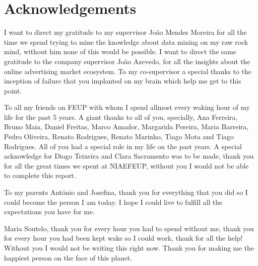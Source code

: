 \chapter*{Acknowledgements}

I want to direct my gratitude to my supervisor João Mendes Moreira for all the
time we spend trying to mine the knowledge about data mining on my raw rock
mind, without him none of this would be possible. I want to direct the same
gratitude to the company supervisor João Azevedo, for all the insights about the
online advertising market ecosystem. To my co-supervisor a special thanks to the
inception of failure that you implanted on my brain which help me get to this
point.

To all my friends on FEUP with whom I spend allmost every waking hour of my life
for the past 5 years. A giant thanks to all of you, specially, Ana Ferreira,
Bruno Maia, Daniel Freitas, Marco Amador, Margarida Pereira, Maria Barreira,
 Pedro Oliveira, Renato Rodrigues, Renato Marinho, Tiago Mota and Tiago Rodrigues. All of you had
a special role in my life on the past years. A special acknowledge for
Diogo Teixeira and Clara Sacramento was to be made, thank you for all the great
times we spent at NIAEFEUP, without you I would not be
able to complete this report.

To my parents António and Josefina, thank you for everything that you did so I
could become the person I am today. I hope I could live to fulfill all the
expectations you have for me.

Maria Soutelo, thank you for every hour you had to spend without me, thank you
for every hour you had been kept wake so I could work, thank for all the help!
Without you I would not be writing this right now. Thank you for making me the
happiest person on the face of this planet.

\vspace{10mm}
